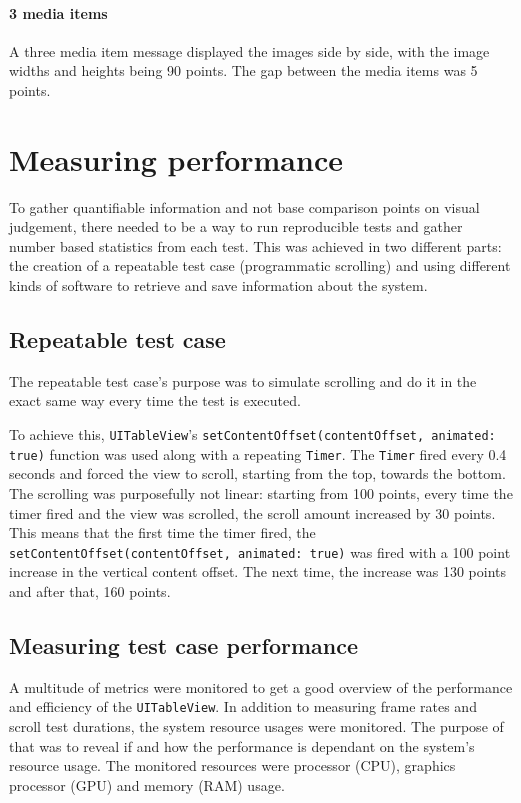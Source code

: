 \documentclass[a4paper,12pt]{article}
\begin{document}
\paragraph*{3 media items}
A three media item message displayed the images side by side, with the image widths and heights being 90 points. The gap between the media items was 5 points.

\newpage
\section{Measuring performance}
To gather quantifiable information and not base comparison points on visual judgement, there needed to be a way to run reproducible tests and gather number based statistics from each test. This was achieved in two different parts: the creation of a repeatable test case (programmatic scrolling) and using different kinds of software to retrieve and save information about the system.

\subsection{Repeatable test case}
The repeatable test case's purpose was to simulate scrolling and do it in the exact same way every time the test is executed.

To achieve this, \texttt{UITableView}'s \texttt{setContentOffset(contentOffset, animated: true)} function was used along with a repeating \texttt{Timer}. The \texttt{Timer} fired every 0.4 seconds and forced the view to scroll, starting from the top, towards the bottom. The scrolling was purposefully not linear: starting from 100 points, every time the timer fired and the view was scrolled, the scroll amount increased by 30 points. This means that the first time the timer fired, the \texttt{setContentOffset(contentOffset, animated: true)} was fired with a 100 point increase in the vertical content offset. The next time, the increase was 130 points and after that, 160 points.

\subsection{Measuring test case performance}
A multitude of metrics were monitored to get a good overview of the performance and efficiency of the \texttt{UITableView}. In addition to measuring frame rates and scroll test durations, the system resource usages were monitored. The purpose of that was to reveal if and how the performance is dependant on the system's resource usage. The monitored resources were processor (CPU), graphics processor (GPU) and memory (RAM) usage.
\end{document}
